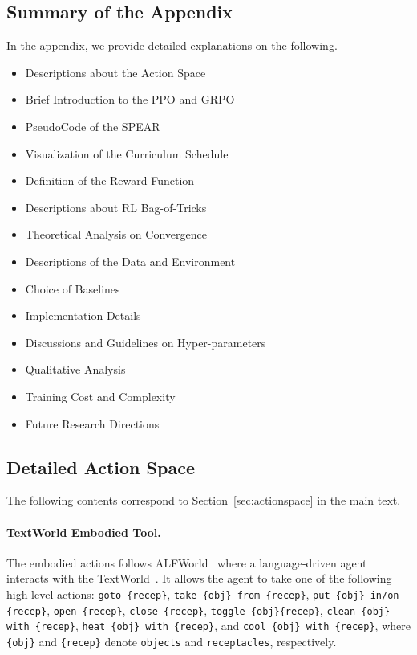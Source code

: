 \documentclass[]{youtu} %
\begin{document}
\subsection{Summary of the Appendix}
\label{sec:actionappdx}
{
In the appendix, we provide detailed explanations on the following.
\begin{itemize}
    \item Descriptions about the Action Space
    \item Brief Introduction to the PPO and GRPO
    \item PseudoCode of the SPEAR
    \item Visualization of the Curriculum Schedule
    \item Definition of the Reward Function
    \item Descriptions about RL Bag-of-Tricks
    \item Theoretical Analysis on Convergence
    \item Descriptions of the Data and Environment
    \item Choice of Baselines
    \item Implementation Details
    \item Discussions and Guidelines on Hyper-parameters
    \item Qualitative Analysis
    \item Training Cost and Complexity
    \item Future Research Directions
\end{itemize}
}



\subsection{Detailed Action Space}
\label{sec:actionspacedetails}

The following contents correspond to Section~\ref{sec:actionspace} in the main text.

\paragraph{TextWorld Embodied Tool.} The embodied actions follows ALFWorld~\cite{shridhar2020alfworld} where a language-driven agent interacts with the TextWorld~\cite{cote2018textworld}. It allows the agent to take one of the following high-level actions: \texttt{goto \{recep\}}, \texttt{take \{obj\} from \{recep\}}, \texttt{put \{obj\} in/on \{recep\}}, \texttt{open \{recep\}}, \texttt{close \{recep\}}, \texttt{toggle \{obj\}\{recep\}}, \texttt{clean \{obj\} with \{recep\}}, \texttt{heat \{obj\} with \{recep\}}, and \texttt{cool \{obj\} with \{recep\}}, where \texttt{\{obj\}} and \texttt{\{recep\}} denote \texttt{objects} and \texttt{receptacles}, respectively.
\end{document}
